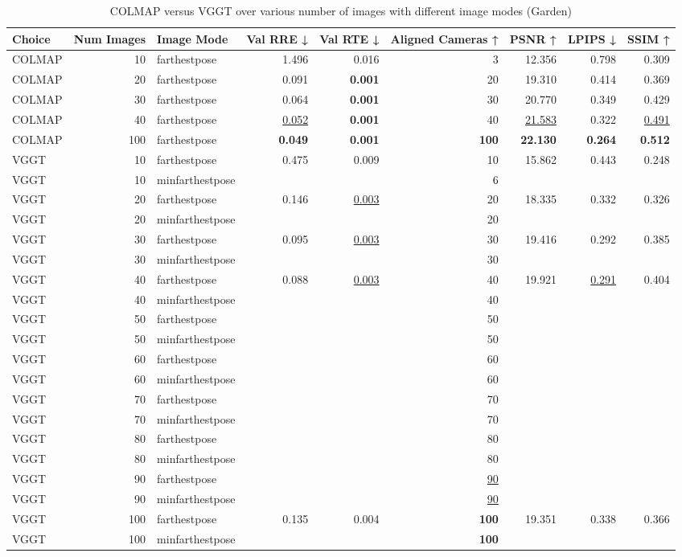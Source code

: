 \begin{table}[H]
\caption{COLMAP versus VGGT over various number of images with different image modes (Garden)}
\label{tab:01_num_images_image_mode_garden}
\centering
\scriptsize
\begin{tabular}{lrlrrrrrr}
\toprule
Choice & Num Images & Image Mode & Val RRE ↓ & Val RTE ↓ & Aligned Cameras ↑ & PSNR ↑ & LPIPS ↓ & SSIM ↑ \\
\midrule
COLMAP & 10 & farthestpose & 1.496 & 0.016 & 3 & 12.356 & 0.798 & 0.309 \\
COLMAP & 20 & farthestpose & 0.091 & \textbf{0.001} & 20 & 19.310 & 0.414 & 0.369 \\
COLMAP & 30 & farthestpose & 0.064 & \textbf{0.001} & 30 & 20.770 & 0.349 & 0.429 \\
COLMAP & 40 & farthestpose & \underline{0.052} & \textbf{0.001} & 40 & \underline{21.583} & 0.322 & \underline{0.491} \\
COLMAP & 100 & farthestpose & \textbf{0.049} & \textbf{0.001} & \textbf{100} & \textbf{22.130} & \textbf{0.264} & \textbf{0.512} \\
VGGT & 10 & farthestpose & 0.475 & 0.009 & 10 & 15.862 & 0.443 & 0.248 \\
VGGT & 10 & minfarthestpose &  &  & 6 &  &  &  \\
VGGT & 20 & farthestpose & 0.146 & \underline{0.003} & 20 & 18.335 & 0.332 & 0.326 \\
VGGT & 20 & minfarthestpose &  &  & 20 &  &  &  \\
VGGT & 30 & farthestpose & 0.095 & \underline{0.003} & 30 & 19.416 & 0.292 & 0.385 \\
VGGT & 30 & minfarthestpose &  &  & 30 &  &  &  \\
VGGT & 40 & farthestpose & 0.088 & \underline{0.003} & 40 & 19.921 & \underline{0.291} & 0.404 \\
VGGT & 40 & minfarthestpose &  &  & 40 &  &  &  \\
VGGT & 50 & farthestpose &  &  & 50 &  &  &  \\
VGGT & 50 & minfarthestpose &  &  & 50 &  &  &  \\
VGGT & 60 & farthestpose &  &  & 60 &  &  &  \\
VGGT & 60 & minfarthestpose &  &  & 60 &  &  &  \\
VGGT & 70 & farthestpose &  &  & 70 &  &  &  \\
VGGT & 70 & minfarthestpose &  &  & 70 &  &  &  \\
VGGT & 80 & farthestpose &  &  & 80 &  &  &  \\
VGGT & 80 & minfarthestpose &  &  & 80 &  &  &  \\
VGGT & 90 & farthestpose &  &  & \underline{90} &  &  &  \\
VGGT & 90 & minfarthestpose &  &  & \underline{90} &  &  &  \\
VGGT & 100 & farthestpose & 0.135 & 0.004 & \textbf{100} & 19.351 & 0.338 & 0.366 \\
VGGT & 100 & minfarthestpose &  &  & \textbf{100} &  &  &  \\
\bottomrule
\end{tabular}
\end{table}